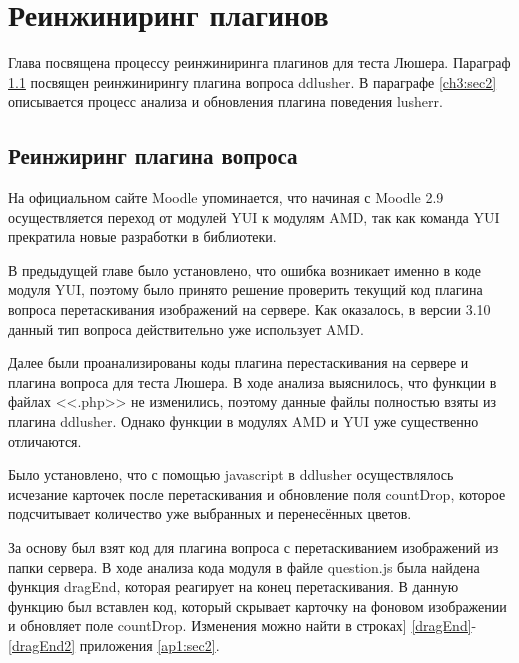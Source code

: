 \chapter{Реинжиниринг плагинов} \label{ch3}


Глава посвящена процессу реинжиниринга плагинов для теста Люшера. Параграф \ref{ch3:sec1} посвящен реинжинирингу плагина вопроса ddlusher. В параграфе \ref{ch3:sec2} описывается процесс анализа и обновления плагина поведения lusherr.
	
\section{Реинжиринг плагина вопроса} \label{ch3:sec1}
На официальном сайте Moodle упоминается, что начиная с Moodle 2.9 осуществляется переход от модулей YUI к модулям AMD, так как команда YUI прекратила новые разработки в библиотеки.\cite{about-yui}

В предыдущей главе было установлено, что ошибка возникает именно в коде модуля YUI, поэтому было принято решение проверить текущий код плагина вопроса перетаскивания изображений на сервере. Как оказалось, в версии 3.10 данный тип вопроса действительно уже использует AMD. 

Далее были проанализированы коды плагина перестаскивания на сервере и плагина вопроса для теста Люшера\cite{psy-test-ddlusher}. В ходе анализа выяснилось, что функции в файлах <<.php>> не изменились, поэтому данные файлы полностью взяты из плагина ddlusher\cite{psy-test-ddlusher}. Однако функции в модулях AMD и YUI уже существенно отличаются. 

Было установлено, что с помощью javascript в ddlusher\cite{psy-test-ddlusher} осуществлялось исчезание карточек после перетаскивания и обновление поля countDrop, которое подсчитывает количество уже выбранных и перенесённых цветов.

За основу был взят код для плагина вопроса с перетаскиванием изображений из папки сервера. В ходе анализа кода модуля в файле question.js была найдена функция dragEnd, которая реагирует на конец перетаскивания. В данную функцию был вставлен код, который скрывает карточку на фоновом изображении и обновляет поле countDrop. Изменения можно найти в строках] \ref{dragEnd}-\ref{dragEnd2} приложения \ref{ap1:sec2}.

